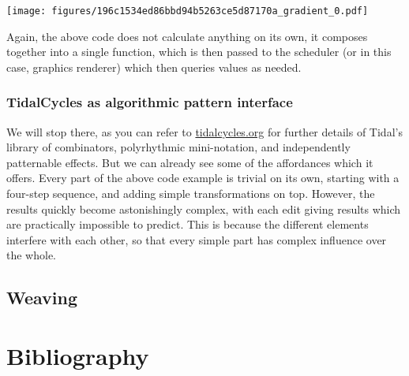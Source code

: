 \documentclass[
]{article}
\begin{document}
\texttt{[image: figures/196c1534ed86bbd94b5263ce5d87170a\_gradient\_0.pdf]}

Again, the above code does not calculate anything on its own, it
composes together into a single function, which is then passed to the
scheduler (or in this case, graphics renderer) which then queries values
as needed.

\hypertarget{tidalcycles-as-algorithmic-pattern-interface}{%
\subsubsection{TidalCycles as algorithmic pattern
interface}\label{tidalcycles-as-algorithmic-pattern-interface}}

We will stop there, as you can refer to
\href{https://tidalcycles.org}{tidalcycles.org} for further details of
Tidal's library of combinators, polyrhythmic mini-notation, and
independently patternable effects. But we can already see some of the
affordances which it offers. Every part of the above code example is
trivial on its own, starting with a four-step sequence, and adding
simple transformations on top. However, the results quickly become
astonishingly complex, with each edit giving results which are
practically impossible to predict. This is because the different
elements interfere with each other, so that every simple part has
complex influence over the whole.

\hypertarget{weaving}{%
\subsection{Weaving}\label{weaving}}

\hypertarget{bibliography}{%
\section*{Bibliography}\label{bibliography}}
\end{document}
